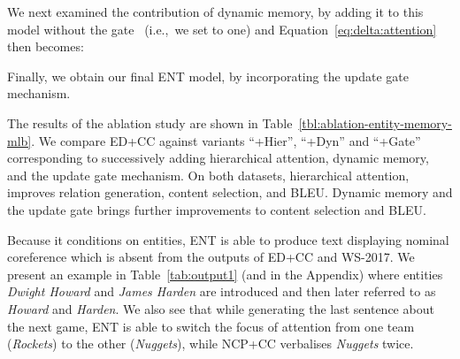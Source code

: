 \documentclass[11pt,a4paper]{article}
\begin{document}
We next examined the contribution of dynamic memory, by adding it to
this model without the gate~ (i.e.,~we set
 to one) and
Equation~\eqref{eq:delta:attention} then becomes:

Finally, we obtain our final ENT model, by incorporating the update
gate mechanism.




The results of the ablation study are shown in
Table~\ref{tbl:ablation-entity-memory-mlb}. We compare ED+CC against
variants ``+Hier'', ``+Dyn'' and ``+Gate'' corresponding
to successively adding hierarchical attention, dynamic memory, and the
update gate mechanism.  On both datasets, hierarchical attention,
improves relation generation, content selection, and BLEU. Dynamic
memory and the update gate brings further improvements to content
selection and BLEU.



Because it conditions on entities, ENT is able to produce text
displaying nominal coreference which is absent from the outputs of
ED+CC and WS-2017. We present an example in Table~\ref{tab:output1}
(and in the Appendix) where entities \textsl{Dwight
  Howard} and \textsl{James Harden} are introduced and then later
referred to as \textsl{Howard} and \textsl{Harden}.  We also see that
while generating the last sentence about the next game, ENT is able to
switch the focus of attention from one team (\textsl{Rockets}) to the
other (\textsl{Nuggets}), while NCP+CC verbalises \emph{Nuggets}
twice.
\end{document}
